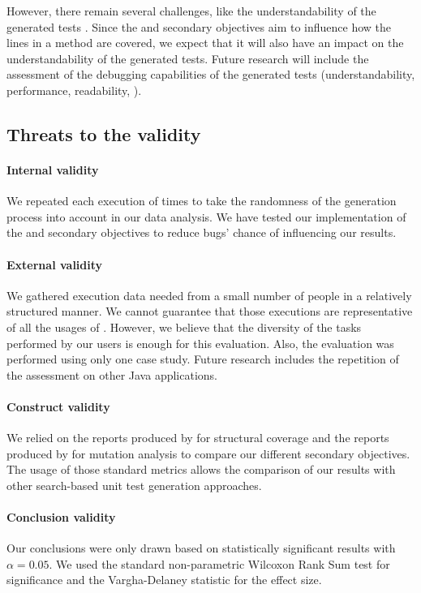 However, there remain several challenges, like the understandability of the generated tests \cite{FA13challenges, almasi2017industrial}. Since the \com and \ucom secondary objectives aim to influence how the lines in a method are covered, we expect that it will also have an impact on the understandability of the generated tests. Future research will include the assessment of the debugging capabilities of the generated tests (\eg understandability, performance, readability, \etc).


\subsection{Threats to the validity}

\paragraph{Internal validity}

We repeated each execution of  times to take the randomness of the generation process into account in our data analysis. 
We have tested our implementation of the \com and \ucom secondary objectives to reduce bugs' chance of influencing our results. 

\paragraph{External validity}

We gathered execution data needed from a small number of people in a relatively structured manner. We cannot guarantee that those executions are representative of all the usages of \jabref. However, we believe that the diversity of the tasks performed by our users is enough for this evaluation. 
Also, the evaluation was performed using only one case study. Future research includes the repetition of the assessment on other Java applications. 

\paragraph{Construct validity}

We relied on the reports produced by \evosuite for structural coverage and the reports produced by \pit for mutation analysis to compare our different secondary objectives. The usage of those standard metrics allows the comparison of our results with other search-based unit test generation approaches. 

\paragraph{Conclusion validity}

Our conclusions were only drawn based on statistically significant results with $\alpha=0.05$. We used the standard non-parametric Wilcoxon Rank Sum test for significance and the Vargha-Delaney statistic for the effect size. 
